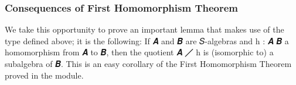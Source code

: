 \subsubsection{Consequences of First Homomorphism Theorem}\label{consequences-of-first-homomorphism-theorem}

We take this opportunity to prove an important lemma that makes use of the  type defined above; it is the following: If \ab 𝑨 and \ab 𝑩 are \ab 𝑆-algebras and \ab h \as :  \ab 𝑨 \ab 𝑩 a homomorphism from \ab 𝑨 to \ab 𝑩, then the quotient \ab 𝑨 \af ╱  \ab h is (isomorphic to) a subalgebra of \ab 𝑩. This is an easy corollary of the First Homomorphism Theorem proved in the  module.
\ccpad
\begin{code}%
\>[0]\AgdaSpace{}%
\AgdaSymbol{:}%
\>[103I]\AgdaSymbol{\{}\AgdaSpace{}%
\AgdaSpace{}%
\AgdaSymbol{:}\AgdaSpace{}%
\AgdaSymbol{\}}\<%
\\
\>[.][@{}l@{}]\<[103I]%
\>[20]\AgdaComment{--}\AgdaSpace{}%
\>[104I]
\\
\>[0][@{}l@{\AgdaIndent{0}}]%
\>[1]%
\>[.][@{}l@{}]\<[104I]%
\>[22]\AgdaSpace{}%
\AgdaSpace{}%
\AgdaSpace{}%
\AgdaSpace{}%
\AgdaSpace{}%
\AgdaSpace{}%
\<%
\\
%
\\[\AgdaEmptyExtraSkip]%
%
\>[1]%
\>[20]\AgdaSymbol{(}\AgdaSpace{}%
\AgdaSymbol{:}\AgdaSpace{}%
\AgdaSpace{}%
\AgdaSpace{}%
\AgdaSymbol{)(}\AgdaSpace{}%
\AgdaSymbol{:}\AgdaSpace{}%
\AgdaSpace{}%
\AgdaSpace{}%
\AgdaSymbol{)(}\AgdaSpace{}%
\AgdaSymbol{:}\AgdaSpace{}%
\AgdaSpace{}%
\AgdaSpace{}%
\AgdaSymbol{)}\<%
\\
%
\\[\AgdaEmptyExtraSkip]%
%
\>[20]\AgdaComment{--}\AgdaSpace{}%
\>[22]\<%
\\
%
\>[1]%
\>[22]\AgdaSpace{}%
\AgdaSpace{}%
\AgdaSpace{}%
\<%
\\
%
\>[1]%
\>[22]\AgdaSpace{}%

\end{code}
